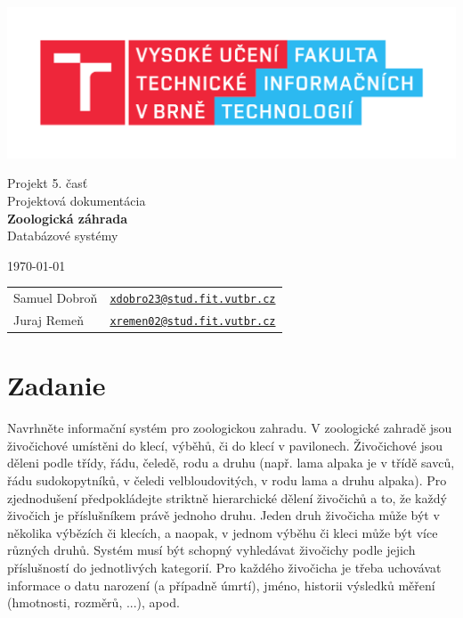 \documentclass[a4paper, 11pt]{article}
\begin{document}
\begin{titlepage}
		\begin{center}
			\includegraphics[width=0.77 \linewidth]{FIT_logo.pdf} \\


			\Huge{Projekt 5. časť} \\
			\Huge{Projektová dokumentácia} \\
			\LARGE{\textbf{Zoologická záhrada}} \\
			\Large{Databázové systémy}

		\end{center}

		{\Large
			\today
			\hfill
			\begin{tabular}{ll}
			Samuel Dobroň & \href{mailto:xdobro23@stud.fit.vutbr.cz}{\texttt{xdobro23@stud.fit.vutbr.cz}} \\
            Juraj Remeň & \href{mailto:xremen02@stud.fit.vutbr.cz}{\texttt{xremen02@stud.fit.vutbr.cz}}
\end{tabular}
}
	\end{titlepage}
	\newpage
	\tableofcontents
	\newpage
	\section{Zadanie}
	Navrhněte informační systém pro zoologickou zahradu. V zoologické zahradě jsou živočichové umístěni do klecí, výběhů, či do klecí v pavilonech. Živočichové jsou děleni podle třídy, řádu, čeledě, rodu a druhu (např. lama alpaka je v třídě savců, řádu sudokopytníků, v čeledi velbloudovitých, v rodu lama a druhu alpaka). Pro zjednodušení předpokládejte striktně hierarchické dělení živočichů a to, že každý živočich je příslušníkem právě jednoho druhu. Jeden druh živočicha může být v několika výbězích či klecích, a naopak, v jednom výběhu či kleci může být více různých druhů. Systém musí být schopný vyhledávat živočichy podle jejich příslušností do jednotlivých kategorií. Pro každého živočicha je třeba uchovávat informace o datu narození (a případně úmrtí), jméno, historii výsledků měření (hmotnosti, rozměrů, ...), apod.
\end{document}

